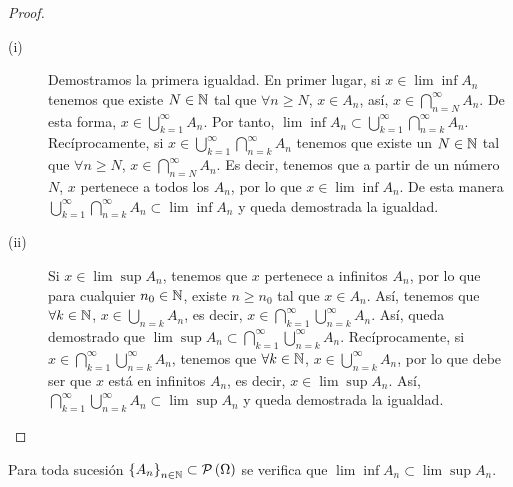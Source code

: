\begin{proof}
\begin{description}
\item[(i)] Demostramos la primera igualdad. En primer lugar, si $\displaystyle x \in \lim \inf A_{n} $ tenemos que existe $\displaystyle N \in \mathbb{N} $ tal que $\displaystyle \forall n \geq N $, $\displaystyle x \in A_{n} $, así, $\displaystyle x \in \bigcap_{n = N}^{\infty}A_{n} $. De esta forma, $\displaystyle x \in \bigcup_{k = 1}^{\infty}A_{n} $. Por tanto, $\displaystyle \lim \inf A_{n} \subset \bigcup_{k = 1}^{\infty}\bigcap_{n = k}^{\infty}A_{n} $. Recíprocamente, si $\displaystyle x \in \bigcup_{k = 1}^{\infty}\bigcap_{n = k}^{\infty}A_{n} $ tenemos que existe un $\displaystyle N \in \mathbb{N} $ tal que $\displaystyle \forall n \geq N $, $\displaystyle x \in \bigcap_{n = N}^{\infty}A_{n} $.
	Es decir, tenemos que a partir de un número $\displaystyle N $, $\displaystyle x $ pertenece a todos los $\displaystyle A_{n} $, por lo que $\displaystyle x \in \lim \inf A_{n} $. De esta manera $\displaystyle \bigcup_{k = 1}^{\infty}\bigcap_{n = k}^{\infty}A_{n} \subset \lim \inf A_{n} $ y queda demostrada la igualdad.
\item[(ii)] Si $\displaystyle x \in \lim \sup A_{n} $, tenemos que $\displaystyle x $ pertenece a infinitos $\displaystyle A_{n} $, por lo que para cualquier $\displaystyle n_{0} \in \mathbb{N} $, existe $\displaystyle n \geq n_{0} $ tal que $\displaystyle x \in A_{n} $.
	Así, tenemos que $\displaystyle \forall k \in \mathbb{N} $, $\displaystyle x \in \bigcup_{n = k}A_{n} $, es decir, $\displaystyle x \in \bigcap_{k = 1}^{\infty}\bigcup_{n = k}^{\infty}A_{n} $. Así, queda demostrado que $\displaystyle \lim \sup A_{n} \subset \bigcap_{k = 1}^{\infty}\bigcup_{n = k}^{\infty}A_{n} $. 
	Recíprocamente, si $\displaystyle x \in \bigcap_{k = 1}^{\infty}\bigcup_{n = k}^{\infty}A_{n} $, tenemos que $\displaystyle \forall k \in \mathbb{N} $, $\displaystyle x \in \bigcup_{n = k}^{\infty}A_{n} $, por lo que debe ser que $\displaystyle x $ está en infinitos $\displaystyle A_{n} $, es decir, $\displaystyle x \in \lim \sup A_{n} $. Así, $\displaystyle \bigcap_{k = 1}^{\infty}\bigcup_{n = k}^{\infty}A_{n} \subset \lim \sup A_{n} $ y queda demostrada la igualdad. 
\end{description}
\end{proof}
\begin{prop}
	Para toda sucesión $\displaystyle \left\{ A_{n}\right\} _{n\in\mathbb{N}} \subset \mathcal{P}\left(\Omega \right) $ se verifica que $\displaystyle \lim \inf A_{n} \subset \lim \sup A_{n} $.
\end{prop}

